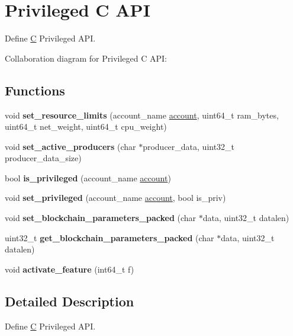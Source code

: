 \hypertarget{group__privilegedcapi}{}\section{Privileged C A\+PI}
\label{group__privilegedcapi}


Define \mbox{\hyperlink{struct_c}{C}} Privileged A\+PI.  


Collaboration diagram for Privileged C A\+PI\+:
\subsection*{Functions}
\begin{DoxyCompactItemize}
\item 
\mbox{\label{group__privilegedcapi_ga3b04b07b03ab6bcd72f0ae8628ea8bdb}} 
void {\bfseries set\+\_\+resource\+\_\+limits} (account\+\_\+name \mbox{\hyperlink{structaccount}{account}}, uint64\+\_\+t ram\+\_\+bytes, uint64\+\_\+t net\+\_\+weight, uint64\+\_\+t cpu\+\_\+weight)
\item 
\mbox{\label{group__privilegedcapi_ga13e710dfe759f02d4d3d46ca06d24993}} 
void {\bfseries set\+\_\+active\+\_\+producers} (char $\ast$producer\+\_\+data, uint32\+\_\+t producer\+\_\+data\+\_\+size)
\item 
\mbox{\label{group__privilegedcapi_ga932c094f2d83f9a5706108d66ebcf3ad}} 
bool {\bfseries is\+\_\+privileged} (account\+\_\+name \mbox{\hyperlink{structaccount}{account}})
\item 
\mbox{\label{group__privilegedcapi_ga7eaefebaad2576dd64c06f9efb66e7b7}} 
void {\bfseries set\+\_\+privileged} (account\+\_\+name \mbox{\hyperlink{structaccount}{account}}, bool is\+\_\+priv)
\item 
\mbox{\label{group__privilegedcapi_ga1d72b091412cf36373b9e5902dbfd95b}} 
void {\bfseries set\+\_\+blockchain\+\_\+parameters\+\_\+packed} (char $\ast$data, uint32\+\_\+t datalen)
\item 
\mbox{\label{group__privilegedcapi_ga4d6063e8201c5cadc5775ba5b1dbb019}} 
uint32\+\_\+t {\bfseries get\+\_\+blockchain\+\_\+parameters\+\_\+packed} (char $\ast$data, uint32\+\_\+t datalen)
\item 
\mbox{\label{group__privilegedcapi_gaaa4fd3068850193329a4569b3a2b91a9}} 
void {\bfseries activate\+\_\+feature} (int64\+\_\+t f)
\end{DoxyCompactItemize}


\subsection{Detailed Description}
Define \mbox{\hyperlink{struct_c}{C}} Privileged A\+PI. 

